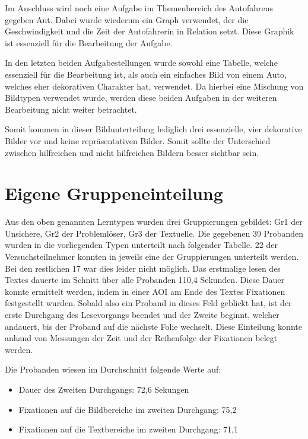 Im Anschluss wird noch eine Aufgabe im Themenbereich des Autofahrens gegeben \gls{Aut}. Dabei wurde wiederum ein Graph verwendet, der die Geschwindigkeit und die Zeit der Autofahrerin in Relation setzt. Diese Graphik ist essenziell für die Bearbeitung der Aufgabe. 


In den letzten beiden Aufgabestellungen wurde sowohl eine Tabelle, welche essenziell für die Bearbeitung ist, als auch ein einfaches Bild von einem Auto, welches eher dekorativen Charakter hat, verwendet. Da hierbei eine Mischung von Bildtypen verwendet wurde, werden diese beiden Aufgaben in der weiteren Bearbeitung nicht weiter betrachtet. 

Somit kommen in dieser Bildunterteilung lediglich drei essenzielle, vier dekorative Bilder vor und keine repräsentativen Bilder. Somit sollte der Unterschied zwischen hilfreichen und nicht hilfreichen Bildern besser sichtbar sein.


\section{Eigene Gruppeneinteilung}

Aus den oben genannten Lerntypen wurden drei Gruppierungen gebildet: \gls{Gr1} der Unsichere, \gls{Gr2} der Problemlöser, \gls{Gr3} der Textuelle. Die gegebenen 39 Probanden wurden in die vorliegenden Typen unterteilt nach folgender Tabelle. 22 der Versuchsteilnehmer konnten in jeweils eine der Gruppierungen unterteilt werden. Bei den restlichen 17 war dies leider nicht möglich. Das erstmalige lesen des Textes dauerte im Schnitt über alle Probanden 110,4 Sekunden. Diese Dauer konnte ermittelt werden, indem in einer AOI am Ende des Textes Fixationen festgestellt wurden. Sobald also ein Proband in dieses Feld geblickt hat, ist der erste Durchgang des Lesevorgangs beendet und der Zweite beginnt, welcher andauert, bis der Proband auf die nächste Folie wechselt. Diese Einteilung konnte anhand von Messungen der Zeit und der Reihenfolge der Fixationen belegt werden. 


Die Probanden wiesen im Durchschnitt folgende Werte auf:
    \begin{itemize}
        \item Dauer des Zweiten Durchgangs: 72,6 Sekungen 
        \item Fixationen auf die Bildbereiche im zweiten Durchgang: 75,2
        \item Fixationen auf die Textbereiche im zweiten Durchgang: 71,1
    \end{itemize}

